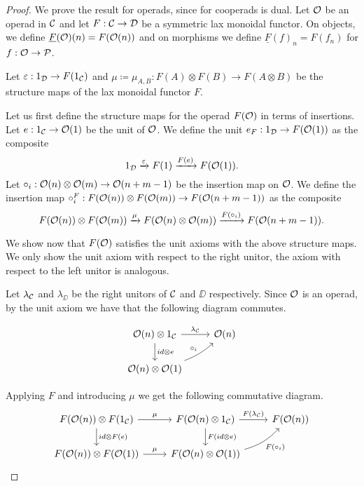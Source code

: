\documentclass[Thesis.tex]{subfiles}
\begin{document}
\begin{proof}
We prove the result for operads, since for cooperads is dual. Let ${\mathcal O}$ be an operad in ${\mathcal C}$ and let $F:{\mathcal C}\to{\mathcal D}$ be a symmetric lax monoidal functor. On objects, we define $\underline{F}({\mathcal O})(n)= F({\mathcal O}(n))$ and on morphisms we define $\underline{F}(f)_n=F(f_n)$ for $f:{\mathcal O}\to\mathcal{P}$. 

Let $\varepsilon: 1_{\mathcal D}\to F(1_{\mathcal C})$ and $\mu\coloneqq\mu_{A,B}: F(A)\otimes F(B)\to F(A\otimes B)$ be the structure maps of the lax monoidal functor $F$. 

Let us first define the structure maps for the operad $F({\mathcal O})$ in terms of insertions. Let $e:1_{\mathcal C}\to{\mathcal O}(1)$ be the unit of ${\mathcal O}$. We define the unit $e_F:1_{\mathcal D}\to F({\mathcal O}(1))$ as the composite
\[1_{\mathcal D}\xrightarrow{\varepsilon} F(1)\xrightarrow{F(e)} F({\mathcal O}(1)).\]
Let $\circ_i :{\mathcal O}(n)\otimes{\mathcal O}(m)\to{\mathcal O}(n+m-1)$ be the insertion map on ${\mathcal O}$. We define the insertion map $\circ_i^F:F({\mathcal O}(n))\otimes F({\mathcal O}(m))\to F({\mathcal O}(n+m-1))$ as the composite
\[F({\mathcal O}(n))\otimes F({\mathcal O}(m))\xrightarrow{\mu} F({\mathcal O}(n)\otimes{\mathcal O}(m))\xrightarrow{F(\circ_i)} F({\mathcal O}(n+m-1)).\]

We show now that $F({\mathcal O})$ satisfies the unit axioms with the above structure maps. We only show the unit axiom with respect to the right unitor, the axiom with respect to the left unitor is analogous.


 Let $\lambda_{\mathcal C}$ and $\lambda_\DD$ be the right unitors of ${\mathcal C}$ and $\DD$ respectively. Since ${\mathcal O}$ is an operad, by the unit axiom we have that the following diagram commutes.
 
  \[
 \begin{tikzcd}
 \OO(n)\otimes 1_\CC\arrow[r, "\lambda_\CC"]\arrow[d, "id\otimes e"] &  \OO(n) \\
 \OO(n)\otimes \OO(1)\arrow[ur, bend right = 10, "\circ_i"]&
 \end{tikzcd}
 \]
 
Applying $F$ and introducing $\mu$ we get the following commutative diagram.
\begin{equation}\label{unitaux}
\begin{tikzcd}
F(\OO(n))\otimes F(1_\CC)\arrow[r,"\mu"]\arrow[d, "id\otimes F(e)"] & F(\OO(n)\otimes 1_\CC)\arrow[r, "F(\lambda_\CC)"]\arrow[d, "F(id\otimes e)"]&
F(\OO(n))\\
F(\OO(n))\otimes F(\OO(1))\arrow[r,"\mu"] & F(\OO(n)\otimes \OO(1))\arrow[ur, bend right = 15, "F(\circ_i)"']
\end{tikzcd}
\end{equation}


\end{proof}
\end{document}

